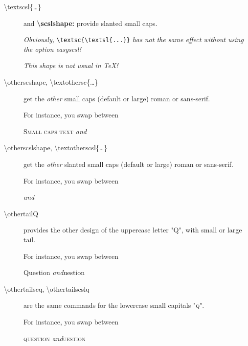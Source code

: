 \documentclass[a4paper,11pt]{article}
\begin{document}
\begin{description}
  \item[\textbackslash textscsl\{\dots\}] and \textbf{\textbackslash scslshape:} 
        provide slanted small caps.
        
        \begin{center}
        \end{center}
  
  \begin{center}
  \textit{Obviously, }\verb=\textsc{\textsl{...}}=\textit{ has not the same effect without using the option \textup{easyscsl}!}
  
  \textit{This shape is not usual in \TeX!}
  \end{center}
  \item[\textbackslash otherscshape, \textbackslash textothersc\{\dots\}]
        get the \textit{other} small caps (default or large) roman or sans-serif.
        
        \begin{center}
        For instance, you swap between
        
        \textsc{Small caps text} \quad\textit{and}\quad {}
        \end{center}
  \item[\textbackslash otherscslshape, \textbackslash textotherscsl\{\dots\}]
        get the \textit{other} slanted small caps (default or large) roman or sans-serif.
        
        \begin{center}
        For instance, you swap between
        
         \quad\textit{and}\quad {}
        \end{center}
  \item[\textbackslash othertailQ]
        provides the other design of the uppercase letter "Q",
        with small or large tail.
        
        \begin{center}
        For instance, you swap between
        
        Question \quad\textit{and}\quad \othertailQ uestion
        \end{center}
  \item[\textbackslash othertailscq, \textbackslash othertailscslq] 
        are the same commands for the lowercase small capitals "\textsc{q}".
        
        \begin{center}
        For instance, you swap between
        
        \textsc{question} \quad\textit{and}\quad \textsc{\othertailscq uestion}
        \end{center}
\end{description}
\end{document}
